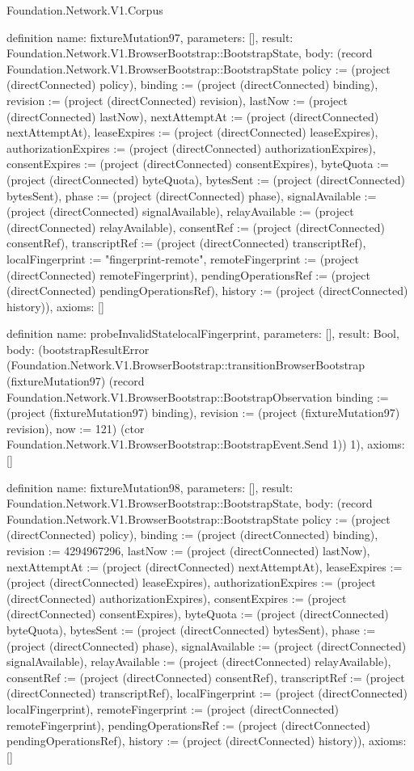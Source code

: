 \begin{lexlean}{Foundation.Network.V1.Corpus}
\begin{semanticmodule}
definition{
  name: fixtureMutation97,
  parameters: [],
  result: Foundation.Network.V1.BrowserBootstrap::BootstrapState,
  body: (record Foundation.Network.V1.BrowserBootstrap::BootstrapState {policy := (project (directConnected) policy), binding := (project (directConnected) binding), revision := (project (directConnected) revision), lastNow := (project (directConnected) lastNow), nextAttemptAt := (project (directConnected) nextAttemptAt), leaseExpires := (project (directConnected) leaseExpires), authorizationExpires := (project (directConnected) authorizationExpires), consentExpires := (project (directConnected) consentExpires), byteQuota := (project (directConnected) byteQuota), bytesSent := (project (directConnected) bytesSent), phase := (project (directConnected) phase), signalAvailable := (project (directConnected) signalAvailable), relayAvailable := (project (directConnected) relayAvailable), consentRef := (project (directConnected) consentRef), transcriptRef := (project (directConnected) transcriptRef), localFingerprint := "fingerprint-remote", remoteFingerprint := (project (directConnected) remoteFingerprint), pendingOperationsRef := (project (directConnected) pendingOperationsRef), history := (project (directConnected) history)}),
  axioms: []
}

definition{
  name: probeInvalidStatelocalFingerprint,
  parameters: [],
  result: Bool,
  body: (bootstrapResultError (Foundation.Network.V1.BrowserBootstrap::transitionBrowserBootstrap (fixtureMutation97) (record Foundation.Network.V1.BrowserBootstrap::BootstrapObservation {binding := (project (fixtureMutation97) binding), revision := (project (fixtureMutation97) revision), now := 121}) (ctor Foundation.Network.V1.BrowserBootstrap::BootstrapEvent.Send 1)) 1),
  axioms: []
}

definition{
  name: fixtureMutation98,
  parameters: [],
  result: Foundation.Network.V1.BrowserBootstrap::BootstrapState,
  body: (record Foundation.Network.V1.BrowserBootstrap::BootstrapState {policy := (project (directConnected) policy), binding := (project (directConnected) binding), revision := 4294967296, lastNow := (project (directConnected) lastNow), nextAttemptAt := (project (directConnected) nextAttemptAt), leaseExpires := (project (directConnected) leaseExpires), authorizationExpires := (project (directConnected) authorizationExpires), consentExpires := (project (directConnected) consentExpires), byteQuota := (project (directConnected) byteQuota), bytesSent := (project (directConnected) bytesSent), phase := (project (directConnected) phase), signalAvailable := (project (directConnected) signalAvailable), relayAvailable := (project (directConnected) relayAvailable), consentRef := (project (directConnected) consentRef), transcriptRef := (project (directConnected) transcriptRef), localFingerprint := (project (directConnected) localFingerprint), remoteFingerprint := (project (directConnected) remoteFingerprint), pendingOperationsRef := (project (directConnected) pendingOperationsRef), history := (project (directConnected) history)}),
  axioms: []
}


\end{semanticmodule}
\end{lexlean}
